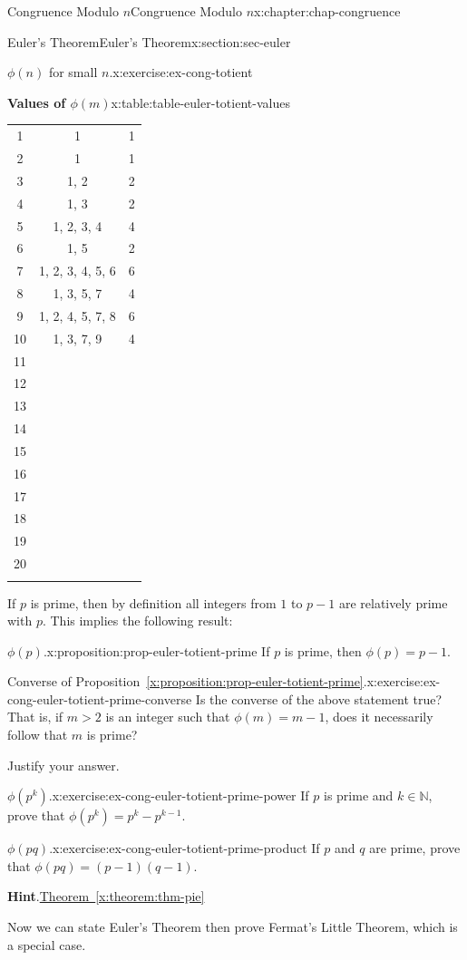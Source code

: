 \documentclass[oneside,10pt,]{book}
\newcommand{\blocktitlefont}{\relax}
\newcommand{\xreffont}{\relax}
\numberwithin{equation}{section}
\newcommand{\hrulemedium}{\noalign{\hrule height 0.07em}}
\newlength{\qrsize}
\newcommand{\gt}{>}
\begin{document}
\begin{chapterptx}{Congruence Modulo \(n\)}{}{Congruence Modulo \(n\)}{}{}{x:chapter:chap-congruence}
\begin{sectionptx}{Euler's Theorem}{}{Euler's Theorem}{}{}{x:section:sec-euler}
\begin{inlineexercise}{\(\phi(n)\) for small \(n\).}{x:exercise:ex-cong-totient}
\begin{tableptx}{\textbf{Values of \(\phi(m)\)}}{x:table:table-euler-totient-values}{}
{\begin{tabular}{ccc}
1&1&1\tabularnewline[0pt]
2&1&1\tabularnewline[0pt]
3&1, 2&2\tabularnewline[0pt]
4&1, 3&2\tabularnewline[0pt]
5&1, 2, 3, 4&4\tabularnewline\hrulemedium
6&1, 5&2\tabularnewline[0pt]
7&1, 2, 3, 4, 5, 6&6\tabularnewline[0pt]
8&1, 3, 5, 7&4\tabularnewline[0pt]
9&1, 2, 4, 5, 7, 8&6\tabularnewline[0pt]
10&1, 3, 7, 9&4\tabularnewline\hrulemedium
11&&\tabularnewline[0pt]
12&&\tabularnewline[0pt]
13&&\tabularnewline[0pt]
14&&\tabularnewline[0pt]
15&&\tabularnewline\hrulemedium
16&&\tabularnewline[0pt]
17&&\tabularnewline[0pt]
18&&\tabularnewline[0pt]
19&&\tabularnewline[0pt]
20&&\tabularnewline\hrulemedium
\end{tabular}
}%
\end{tableptx}%
\end{inlineexercise}%
If \(p\) is prime, then by definition all integers from \(1\) to \(p-1\) are relatively prime with \(p\). This implies the following result:%
\begin{proposition}{\(\phi(p)\).}{}{x:proposition:prop-euler-totient-prime}%
If \(p\) is prime, then \(\phi(p) = p-1\).%
\end{proposition}
\begin{inlineexercise}{Converse of Proposition~{\xreffont\ref*{x:proposition:prop-euler-totient-prime}}.}{x:exercise:ex-cong-euler-totient-prime-converse}%
Is the converse of the above statement true? That is, if \(m \gt 2\) is an integer such that \(\phi(m) = m-1\), does it necessarily follow that \(m\) is prime?%
\par
Justify your answer.%
\end{inlineexercise}%
\begin{inlineexercise}{\(\phi(p^k)\).}{x:exercise:ex-cong-euler-totient-prime-power}%
If \(p\) is prime and \(k \in \mathbb{N}\), prove that \(\phi(p^k) = p^k - p^{k-1}\).%
\end{inlineexercise}%
\begin{inlineexercise}{\(\phi(pq)\).}{x:exercise:ex-cong-euler-totient-prime-product}%
If \(p\) and \(q\) are prime, prove that \(\phi(pq) = (p-1)(q-1)\).%
\par\smallskip%
\noindent\textbf{\blocktitlefont Hint}.\hypertarget{g:hint:id536825}{}\quad{}\hyperref[x:theorem:thm-pie]{Theorem~{\xreffont\ref{x:theorem:thm-pie}}}%
\end{inlineexercise}%
Now we can state Euler's Theorem then prove Fermat's Little Theorem, which is a special case.%
\begin{sidebyside}{1}{0}{0}{0}%
\begin{sbspanel}{1}%
\setlength{\qrsize}{9em}

\end{sbspanel}
\end{sidebyside}
\end{sectionptx}
\end{chapterptx}
\end{document}

